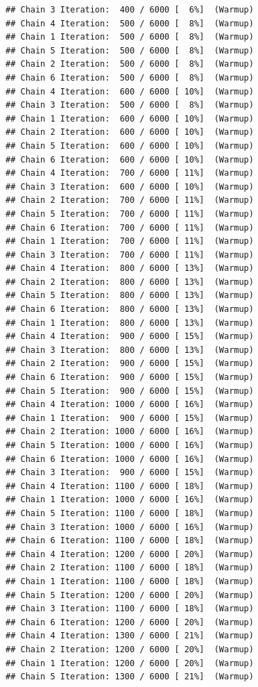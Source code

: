 \documentclass[
]{article}
\begin{document}
\begin{verbatim}
## Chain 3 Iteration:  400 / 6000 [  6%]  (Warmup) 
## Chain 4 Iteration:  500 / 6000 [  8%]  (Warmup) 
## Chain 1 Iteration:  500 / 6000 [  8%]  (Warmup) 
## Chain 5 Iteration:  500 / 6000 [  8%]  (Warmup) 
## Chain 2 Iteration:  500 / 6000 [  8%]  (Warmup) 
## Chain 6 Iteration:  500 / 6000 [  8%]  (Warmup) 
## Chain 4 Iteration:  600 / 6000 [ 10%]  (Warmup) 
## Chain 3 Iteration:  500 / 6000 [  8%]  (Warmup) 
## Chain 1 Iteration:  600 / 6000 [ 10%]  (Warmup) 
## Chain 2 Iteration:  600 / 6000 [ 10%]  (Warmup) 
## Chain 5 Iteration:  600 / 6000 [ 10%]  (Warmup) 
## Chain 6 Iteration:  600 / 6000 [ 10%]  (Warmup) 
## Chain 4 Iteration:  700 / 6000 [ 11%]  (Warmup) 
## Chain 3 Iteration:  600 / 6000 [ 10%]  (Warmup) 
## Chain 2 Iteration:  700 / 6000 [ 11%]  (Warmup) 
## Chain 5 Iteration:  700 / 6000 [ 11%]  (Warmup) 
## Chain 6 Iteration:  700 / 6000 [ 11%]  (Warmup) 
## Chain 1 Iteration:  700 / 6000 [ 11%]  (Warmup) 
## Chain 3 Iteration:  700 / 6000 [ 11%]  (Warmup) 
## Chain 4 Iteration:  800 / 6000 [ 13%]  (Warmup) 
## Chain 2 Iteration:  800 / 6000 [ 13%]  (Warmup) 
## Chain 5 Iteration:  800 / 6000 [ 13%]  (Warmup) 
## Chain 6 Iteration:  800 / 6000 [ 13%]  (Warmup) 
## Chain 1 Iteration:  800 / 6000 [ 13%]  (Warmup) 
## Chain 4 Iteration:  900 / 6000 [ 15%]  (Warmup) 
## Chain 3 Iteration:  800 / 6000 [ 13%]  (Warmup) 
## Chain 2 Iteration:  900 / 6000 [ 15%]  (Warmup) 
## Chain 6 Iteration:  900 / 6000 [ 15%]  (Warmup) 
## Chain 5 Iteration:  900 / 6000 [ 15%]  (Warmup) 
## Chain 4 Iteration: 1000 / 6000 [ 16%]  (Warmup) 
## Chain 1 Iteration:  900 / 6000 [ 15%]  (Warmup) 
## Chain 2 Iteration: 1000 / 6000 [ 16%]  (Warmup) 
## Chain 5 Iteration: 1000 / 6000 [ 16%]  (Warmup) 
## Chain 6 Iteration: 1000 / 6000 [ 16%]  (Warmup) 
## Chain 3 Iteration:  900 / 6000 [ 15%]  (Warmup) 
## Chain 4 Iteration: 1100 / 6000 [ 18%]  (Warmup) 
## Chain 1 Iteration: 1000 / 6000 [ 16%]  (Warmup) 
## Chain 5 Iteration: 1100 / 6000 [ 18%]  (Warmup) 
## Chain 3 Iteration: 1000 / 6000 [ 16%]  (Warmup) 
## Chain 6 Iteration: 1100 / 6000 [ 18%]  (Warmup) 
## Chain 4 Iteration: 1200 / 6000 [ 20%]  (Warmup) 
## Chain 2 Iteration: 1100 / 6000 [ 18%]  (Warmup) 
## Chain 1 Iteration: 1100 / 6000 [ 18%]  (Warmup) 
## Chain 5 Iteration: 1200 / 6000 [ 20%]  (Warmup) 
## Chain 3 Iteration: 1100 / 6000 [ 18%]  (Warmup) 
## Chain 6 Iteration: 1200 / 6000 [ 20%]  (Warmup) 
## Chain 4 Iteration: 1300 / 6000 [ 21%]  (Warmup) 
## Chain 2 Iteration: 1200 / 6000 [ 20%]  (Warmup) 
## Chain 1 Iteration: 1200 / 6000 [ 20%]  (Warmup) 
## Chain 5 Iteration: 1300 / 6000 [ 21%]  (Warmup) 

\end{verbatim}
\end{document}
